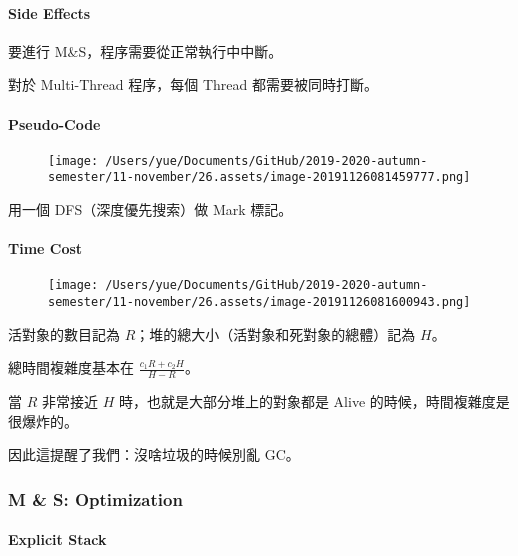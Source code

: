 \documentclass[
]{article}
\begin{document}
\hypertarget{header-n18}{%
\paragraph{Side Effects}\label{header-n18}}

要進行 M\&S，程序需要從正常執行中中斷。

對於 Multi-Thread 程序，每個 Thread 都需要被同時打斷。

\hypertarget{header-n21}{%
\paragraph{Pseudo-Code}\label{header-n21}}

\begin{figure}
\centering
\texttt{[image: /Users/yue/Documents/GitHub/2019-2020-autumn-semester/11-november/26.assets/image-20191126081459777.png]}
\caption{}
\end{figure}

用一個 DFS（深度優先搜索）做 Mark 標記。

\hypertarget{header-n24}{%
\paragraph{Time Cost}\label{header-n24}}

\begin{figure}
\centering
\texttt{[image: /Users/yue/Documents/GitHub/2019-2020-autumn-semester/11-november/26.assets/image-20191126081600943.png]}
\caption{}
\end{figure}

活對象的數目記為 \(R\)；堆的總大小（活對象和死對象的總體）記為 \(H\)。

總時間複雜度基本在 \(\frac {c_1R + c_2H} {H - R}\)。

當 \(R\) 非常接近 \(H\) 時，也就是大部分堆上的對象都是 Alive
的時候，時間複雜度是很爆炸的。

因此這提醒了我們：沒啥垃圾的時候別亂 GC。

\hypertarget{header-n30}{%
\subsubsection{M \& S: Optimization}\label{header-n30}}

\hypertarget{header-n31}{%
\paragraph{Explicit Stack}\label{header-n31}}
\end{document}
